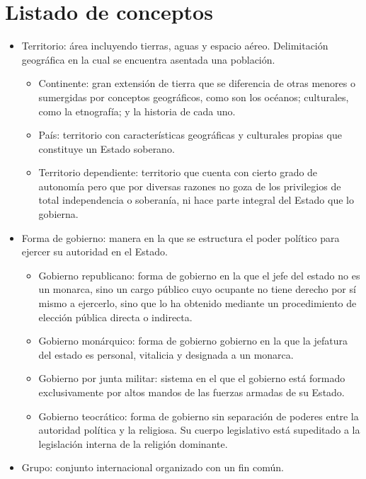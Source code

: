 \documentclass[11pt]{article}
\begin{document}
\section{Listado de conceptos}
\begin{itemize}
    \item Territorio: área incluyendo tierras, aguas y espacio aéreo. Delimitación geográfica en la cual se encuentra asentada una población.
    \begin{itemize}
        \item Continente: gran extensión de tierra que se diferencia de otras menores o sumergidas por conceptos geográficos, como son los océanos; culturales, como la etnografía; y la historia de cada uno.
        \item País: territorio con características geográficas y culturales propias que constituye un Estado soberano.
        \item Territorio dependiente: territorio que cuenta con cierto grado de autonomía pero que por diversas razones no goza de los privilegios de total independencia o soberanía, ni hace parte integral del Estado que lo gobierna.
    \end{itemize}
    \item Forma de gobierno: manera en la que se estructura el poder político para ejercer su autoridad en el Estado. 
    \begin{itemize}
        \item Gobierno republicano: forma de gobierno en la que el jefe del estado no es un monarca, sino un cargo público cuyo ocupante no tiene derecho por sí mismo a ejercerlo, sino que lo ha obtenido mediante un procedimiento de elección pública directa o indirecta. 
        \item Gobierno monárquico: forma de gobierno gobierno en la que la jefatura del estado es personal, vitalicia y designada a un monarca. 
        \item Gobierno por junta militar: sistema en el que el gobierno está formado exclusivamente por altos mandos de las fuerzas armadas de su Estado.
        \item Gobierno teocrático: forma de gobierno sin separación de poderes entre la autoridad política y la religiosa. Su cuerpo legislativo está supeditado a la legislación interna de la religión dominante.
    \end{itemize}
    \item Grupo: conjunto internacional organizado con un fin común.
    \begin{itemize}

\end{itemize}
\end{itemize}
\end{document}
